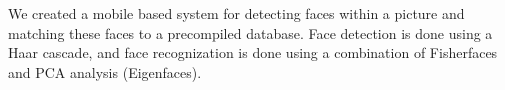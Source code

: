 We created a mobile based system for detecting faces within a
picture and matching these faces to a precompiled database.
Face detection is done using a Haar cascade, and
face recognization is done using a combination of Fisherfaces
and PCA analysis (Eigenfaces).



